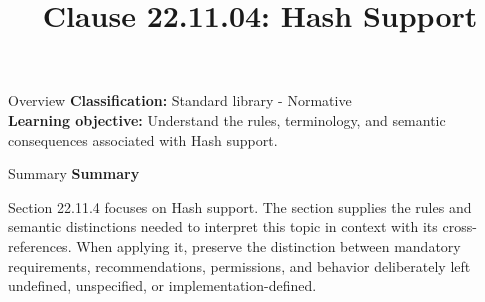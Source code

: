 \documentclass[10pt,letterpaper]{article}
\title{Clause 22.11.04: Hash Support}
\author{}
\date{}
\begin{document}
\maketitle
\begin{CornellOverviewBox}{Overview}
\textbf{Classification:} Standard library - Normative\\[2pt]
\textbf{Learning objective:} Understand the rules, terminology, and semantic consequences associated with Hash support.
\end{CornellOverviewBox}\begin{CornellSummaryBox}{Summary}
{\sffamily\bfseries\color{Accent} Summary}\par\vspace{3pt}Section 22.11.4 focuses on Hash support. The section supplies the rules and semantic distinctions needed to interpret this topic in context with its cross-references. When applying it, preserve the distinction between mandatory requirements, recommendations, permissions, and behavior deliberately left undefined, unspecified, or implementation-defined.
\end{CornellSummaryBox}
\end{document}
